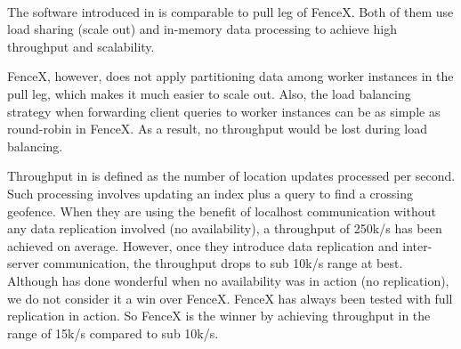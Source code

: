 \documentclass[a4]{report}
\begin{document}
    \paragraph{}
    The software introduced in \cite{Cirillo-Jacobs-Martin-Szczytowski-2014} is comparable to pull leg of FenceX.
    Both of them use load sharing (scale out) and in-memory data processing to achieve high throughput and scalability.

    FenceX, however, does not apply partitioning data among worker instances in the pull leg, which makes it much easier to
    scale out.
    Also, the load balancing strategy when forwarding client queries to worker instances can be as simple as
    round-robin in FenceX.
    As a result, no throughput would be lost during load balancing.

    Throughput in \cite{Cirillo-Jacobs-Martin-Szczytowski-2014} is defined as the number of location updates processed per second.
    Such processing involves updating an index plus a query to find a crossing geofence.
    When they are using the benefit of localhost communication without any data replication involved (no availability), a
    throughput of 250k/s has been achieved on average.
    However, once they introduce data replication and inter-server communication, the throughput drops to sub 10k/s
    range at best.
    Although \cite{Cirillo-Jacobs-Martin-Szczytowski-2014} has done wonderful when no availability was in action (no
    replication), we do not consider it a win over FenceX.
    FenceX has always been tested with full replication in action.
    So FenceX is the winner by achieving throughput in the range of 15k/s compared to sub 10k/s.

    \clearpage
\end{document}
